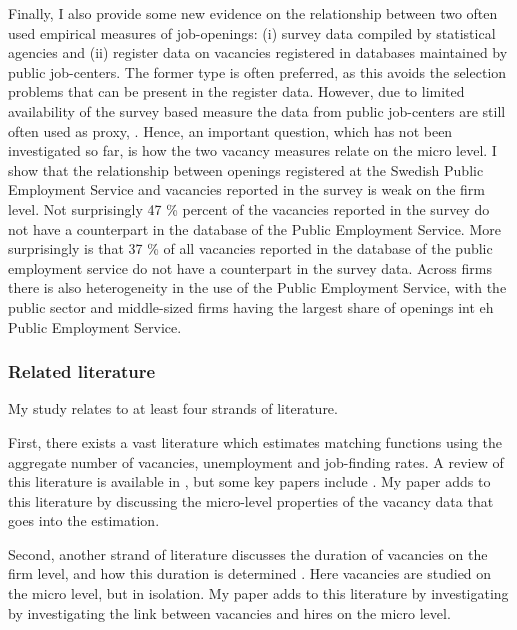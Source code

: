 Finally, I also provide some new evidence on the relationship between two often used empirical measures of job-openings: (i) survey data compiled by statistical agencies and (ii) register data on vacancies registered in databases maintained by public job-centers. The former type is often preferred, as this avoids the selection problems that can be present in the register data. However, due to limited availability of the survey based measure \citep{Elsby2015} the data from public job-centers are still often used as proxy, \citep{Berman1997, Carlsson2013, Hansen2004,  Wall2002, Yashiv2000}. Hence, an important question, which has not been investigated so far, is how the two vacancy measures relate on the micro level. I show that the relationship between openings registered at the Swedish Public Employment Service and vacancies reported in the survey is weak on the firm level. Not surprisingly 47 \% percent of the vacancies reported in the survey do not have a counterpart in the database of the Public Employment Service. More surprisingly is that 37 \% of all vacancies reported in the database of the public employment service do not have a counterpart in the survey data. Across firms there is also heterogeneity in the use of the Public Employment Service, with the public sector and middle-sized firms having the largest share of openings int eh Public Employment Service. 

\subsubsection{Related literature}

My study relates to at least four strands of literature. 

First, there exists a vast literature which estimates matching functions using the aggregate number of vacancies, unemployment and job-finding rates. A review of this literature is available in \cite{Pissarides2000}, but some key papers include \cite{Blanchard1990, Berman1997, Yashiv2000, Hansen2004, Sunde2007, Gross1997, Entorf1998, Feve1996}. My paper adds to this literature by discussing the micro-level properties of the vacancy data that goes into the estimation. 

Second, another strand of literature discusses the duration of vacancies on the firm level, and how this duration is determined \citep{Ours1991, Burdett1998, Barron1997, Holzer1990}. Here vacancies are studied on the micro level, but in isolation. My paper adds to this literature by investigating by investigating the link between vacancies and hires on the micro level. 

